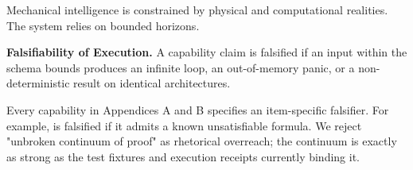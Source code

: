 Mechanical intelligence is constrained by physical and computational realities. The system relies on bounded horizons. 

\begin{definition}
\textbf{Falsifiability of Execution.} A capability claim is falsified if an input within the schema bounds produces an infinite loop, an out-of-memory panic, or a non-deterministic result on identical architectures.
\end{definition}

Every capability in Appendices A and B specifies an item-specific falsifier. For example,  is falsified if it admits a known unsatisfiable formula. We reject "unbroken continuum of proof" as rhetorical overreach; the continuum is exactly as strong as the test fixtures and execution receipts currently binding it.
